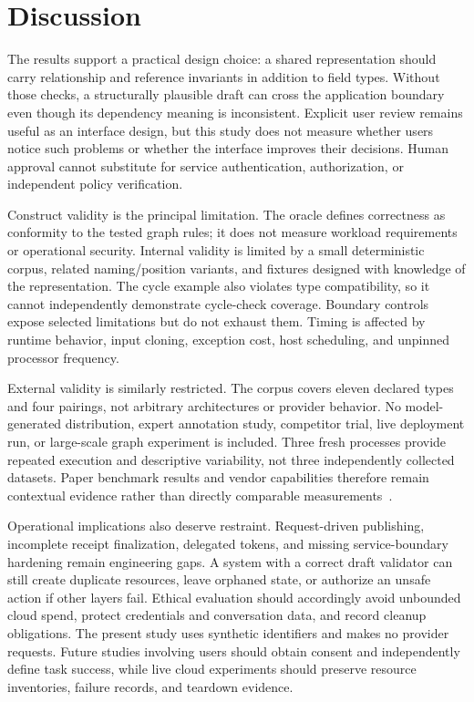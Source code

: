 \section{Discussion}
The results support a practical design choice: a shared representation should carry relationship and reference invariants in addition to field types. Without those checks, a structurally plausible draft can cross the application boundary even though its dependency meaning is inconsistent. Explicit user review remains useful as an interface design, but this study does not measure whether users notice such problems or whether the interface improves their decisions. Human approval cannot substitute for service authentication, authorization, or independent policy verification.

Construct validity is the principal limitation. The oracle defines correctness as conformity to the tested graph rules; it does not measure workload requirements or operational security. Internal validity is limited by a small deterministic corpus, related naming/position variants, and fixtures designed with knowledge of the representation. The cycle example also violates type compatibility, so it cannot independently demonstrate cycle-check coverage. Boundary controls expose selected limitations but do not exhaust them. Timing is affected by runtime behavior, input cloning, exception cost, host scheduling, and unpinned processor frequency.

External validity is similarly restricted. The corpus covers eleven declared types and four pairings, not arbitrary architectures or provider behavior. No model-generated distribution, expert annotation study, competitor trial, live deployment run, or large-scale graph experiment is included. Three fresh processes provide repeated execution and descriptive variability, not three independently collected datasets. Paper benchmark results and vendor capabilities therefore remain contextual evidence rather than directly comparable measurements~\cite{iaceval2024,iacgen2026,massdriver}.

Operational implications also deserve restraint. Request-driven publishing, incomplete receipt finalization, delegated tokens, and missing service-boundary hardening remain engineering gaps. A system with a correct draft validator can still create duplicate resources, leave orphaned state, or authorize an unsafe action if other layers fail. Ethical evaluation should accordingly avoid unbounded cloud spend, protect credentials and conversation data, and record cleanup obligations. The present study uses synthetic identifiers and makes no provider requests. Future studies involving users should obtain consent and independently define task success, while live cloud experiments should preserve resource inventories, failure records, and teardown evidence.

